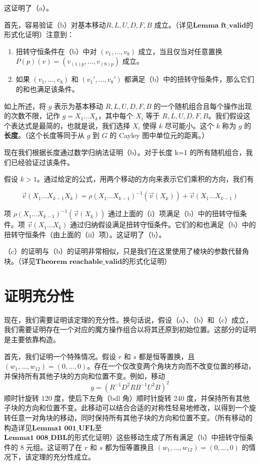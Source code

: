 \documentclass{article}
\begin{document}
这证明了（a）。

首先，容易验证（b）对基本移动\( R, L, U, D, F, B \) 成立。（详见$\mathbf{Lemma}\,\,\mathbf{ft}\_\mathbf{valid}$的形式化证明）注意到：

\begin{enumerate}
    \item 扭转守恒条件在（b）中对 \( (v_1, \dots, v_8) \) 成立，当且仅当对任意置换 \( P(p)(v) = (v_{(1)p}, \dots, v_{(8)p}) \) 成立。

    \item 如果 \( (v_1, \dots, v_8) \) 和 \( (v_1', \dots, v_8') \) 都满足（b）中的扭转守恒条件，那么它们的和也满足该条件。
\end{enumerate}

如上所述，将 \( g \) 表示为基本移动 \( R, L, U, D, F, B \) 的一个随机组合且每个操作出现的次数不限，记作 \( g = X_1 \dots X_k \)，其中每个 \( X_i \) 等于 \( R, L, U, D, F, B \)。我们假设这个表达式是最简的，也就是说，我们选择 \( X_i \) 使得 \( k \) 尽可能小。这个 \( k \) 称为 \( g \) 的\textbf{长度}。（这个长度等同于从 \( g \) 到 \( G \) 的 Cayley 图中单位元的距离。）

现在我们根据长度通过数学归纳法证明（b）。对于长度 k=1 的所有随机组合，我们已经验证过该条件。

假设 \( k > 1 \)。通过给定的公式，用两个移动的方向来表示它们乘积的方向，我们有

\[
\vec{v}(X_1 \dots X_{k-1} X_k) = \rho(X_1 \dots X_{k-1})^{-1}(\vec{v}(X_k)) + \vec{v}(X_1 \dots X_{k-1})
\]

项 \( \rho(X_1 \dots X_{k-1})^{-1}(\vec{v}(X_k)) \) 通过上面的（i）项满足（b）中的扭转守恒条件。项 \( \vec{v}(X_1 \dots X_{k}) \) 通过归纳假设满足扭转守恒条件。它们的和也满足（b）中的扭转守恒条件（由上面的（ii）项）。这证明了（b）。

（c）的证明与（b）的证明非常相似，只是我们在这里使用了棱块的参数代替角块。（详见$\mathbf{Theorem}\,\,\mathbf{reachable}\_\mathbf{valid}$的形式化证明）
\section*{证明充分性}

现在，我们需要证明该定理的充分性。换句话说，假设（a）、（b）和（c）成立，我们需要证明存在一个对应的魔方操作组合以将其还原到初始位置。这部分的证明是主要依靠构造。

首先，我们证明一个特殊情况。假设 \( r \) 和 \( s \) 都是恒等置换，且 \( (w_1, \dots, w_{12}) = (0, \dots, 0) \)。存在一个仅改变两个角块方向而不改变位置的移动，并保持所有其他子块的方向和位置不变。例如，移动
\[
g = (R^{-1} D^2 R B^{-1} U^2 B)^2
\]顺时针旋转 120 度，使后下左角（bdl 角）顺时针旋转 240 度，并保持所有其他子块的方向和位置不变。此移动可以结合合适的对称性轻易地修改，以得到一个旋转任意一对角块的移动，同时保持所有其他子块的方向和位置不变。（所有移动的构造详见$\mathbf{Lemma1}\,\,\mathbf{001}\_\mathbf{UFL}$至\\$\mathbf{Lemma1}\,\,\mathbf{008}\_\mathbf{DBL}$的形式化证明）这些移动生成了所有满足（b）中扭转守恒条件的 8 元组。这证明了在 \( r \) 和 \( s \) 都为恒等置换且 \( (w_1, \dots, w_{12}) = (0, \dots, 0) \) 的情况下，该定理的充分性成立。
\end{document}
